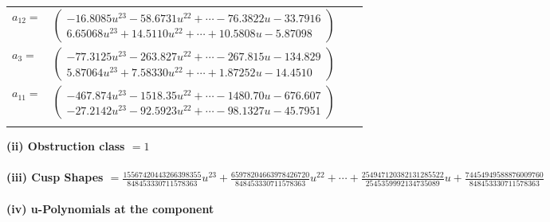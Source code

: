 \documentclass[1p]{elsarticle_modified}
\theoremstyle{definition}
\begin{document}
\begin{tabular}{m{7pt} m{180pt} m{7pt} m{180pt} }
\flushright $a_{12}=$&$\begin{pmatrix}-16.8085 u^{23}-58.6731 u^{22}+\cdots-76.3822 u-33.7916\\6.65068 u^{23}+14.5110 u^{22}+\cdots+10.5808 u-5.87098\end{pmatrix}$ \\
\flushright $a_{3}=$&$\begin{pmatrix}-77.3125 u^{23}-263.827 u^{22}+\cdots-267.815 u-134.829\\5.87064 u^{23}+7.58330 u^{22}+\cdots+1.87252 u-14.4510\end{pmatrix}$ \\
\flushright $a_{11}=$&$\begin{pmatrix}-467.874 u^{23}-1518.35 u^{22}+\cdots-1480.70 u-676.607\\-27.2142 u^{23}-92.5923 u^{22}+\cdots-98.1327 u-45.7951\end{pmatrix}$\\&\end{tabular}
\flushleft \textbf{(ii) Obstruction class $= 1$}\\~\\
\flushleft \textbf{(iii) Cusp Shapes $= \frac{15567420443266398355}{848453330711578363} u^{23}+\frac{65978204663978426720}{848453330711578363} u^{22}+\cdots+\frac{254947120382131285522}{2545359992134735089} u+\frac{74454949588876009760}{848453330711578363}$}\\~\\
\newpage\renewcommand{\arraystretch}{1}
\flushleft \textbf{(iv) u-Polynomials at the component}\newline \\
\end{document}
